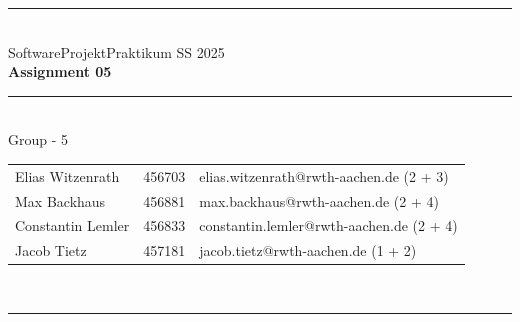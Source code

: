 \documentclass[a4paper,12pt]{article}
\begin{document}
\begin{center}
	\rule{\textwidth}{0.1pt}\\[1cm]
	
	\Large SoftwareProjektPraktikum SS 2025\\\bf Assignment 05
\end{center}


\begin{center}

	\rule{\textwidth}{0.1pt}\\[0.5cm]

	{\Large Group - 5\\[5mm]} %

	\begin{tabular}{lll}
		Elias Witzenrath & 456703 & elias.witzenrath@rwth-aachen.de (2 + 3) \\

		Max Backhaus & 456881 & max.backhaus@rwth-aachen.de (2 + 4)\\

		Constantin Lemler & 456833 & constantin.lemler@rwth-aachen.de  (2 + 4)\\

        Jacob Tietz & 457181 & jacob.tietz@rwth-aachen.de (1 + 2)\\

	\end{tabular}\\[0.5cm]

	\rule{\textwidth}{0.1pt}\\[1cm]

\end{center}





\end{document}
